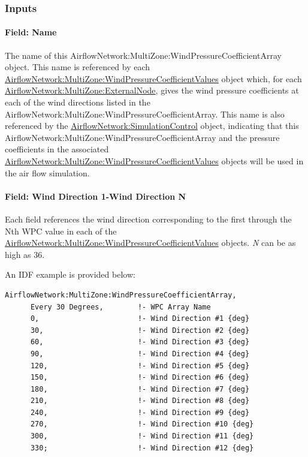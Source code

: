 \subsubsection{Inputs}\label{inputs-9-001}

\paragraph{Field: Name}\label{field-name-9-001}

The name of this AirflowNetwork:MultiZone:WindPressureCoefficientArray object. This name is referenced by each \hyperref[airflownetworkmultizonewindpressurecoefficientvalues]{AirflowNetwork:MultiZone:WindPressureCoefficientValues} object which, for each \hyperref[airflownetworkmultizoneexternalnode]{AirflowNetwork:MultiZone:ExternalNode}, gives the wind pressure coefficients at each of the wind directions listed in the AirflowNetwork:MultiZone:WindPressureCoefficientArray. This name is also referenced by the \hyperref[airflownetworksimulationcontrol]{AirflowNetwork:\hyperref[simulationcontrol]{SimulationControl}} object, indicating that this AirflowNetwork:MultiZone:WindPressureCoefficientArray and the pressure coefficients in the associated \hyperref[airflownetworkmultizonewindpressurecoefficientvalues]{AirflowNetwork:MultiZone:WindPressureCoefficientValues} objects will be used in the air flow simulation.

\paragraph{Field: Wind Direction 1-Wind Direction N}\label{field-wind-direction-1-wind-direction-n}

Each field references the wind direction corresponding to the first through the Nth WPC value in each of the \hyperref[airflownetworkmultizonewindpressurecoefficientvalues]{AirflowNetwork:MultiZone:WindPressureCoefficientValues} objects. \emph{N} can be as high as 36.

An IDF example is provided below:

\begin{lstlisting}
AirflowNetwork:MultiZone:WindPressureCoefficientArray,
      Every 30 Degrees,        !- WPC Array Name
      0,                       !- Wind Direction #1 {deg}
      30,                      !- Wind Direction #2 {deg}
      60,                      !- Wind Direction #3 {deg}
      90,                      !- Wind Direction #4 {deg}
      120,                     !- Wind Direction #5 {deg}
      150,                     !- Wind Direction #6 {deg}
      180,                     !- Wind Direction #7 {deg}
      210,                     !- Wind Direction #8 {deg}
      240,                     !- Wind Direction #9 {deg}
      270,                     !- Wind Direction #10 {deg}
      300,                     !- Wind Direction #11 {deg}
      330;                     !- Wind Direction #12 {deg}
\end{lstlisting}

